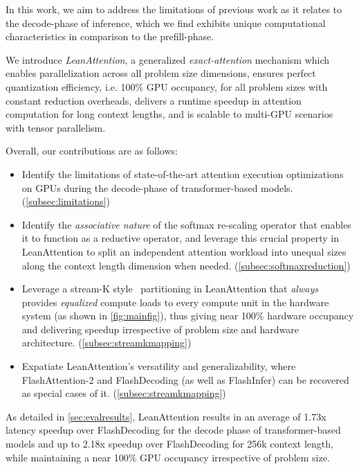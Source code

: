 In this work, we aim to address the limitations of previous work as it relates to the decode-phase of inference, which we find exhibits unique computational characteristics in comparison to the prefill-phase. 

We introduce \emph{LeanAttention}, a generalized \emph{exact-attention} mechanism which enables parallelization across all problem size dimensions, ensures perfect quantization efficiency, i.e. 100\% GPU occupancy, for all problem sizes with constant reduction overheads, delivers a runtime speedup in attention computation for long context lengths, and is scalable to multi-GPU scenarios with tensor parallelism. 

Overall, our contributions are as follows:

\begin{itemize}[noitemsep]

    \item Identify the limitations of state-of-the-art attention execution optimizations on GPUs during the decode-phase of transformer-based models. (\autoref{subsec:limitations})

    \item Identify the \textit{associative nature} of the softmax re-scaling operator that enables it to function as a reductive operator, and leverage this crucial property in LeanAttention to split an independent attention workload into unequal sizes along the context length dimension when needed. (\autoref{subsec:softmaxreduction})
    \item Leverage a stream-K style~\cite{streamk} partitioning in LeanAttention that \textit{always} provides \textit{equalized} compute loads to every compute unit in the hardware system (as shown in \autoref{fig:mainfig}), thus giving near 100\% hardware occupancy and delivering speedup irrespective of problem size and hardware architecture. (\autoref{subsec:streamkmapping})

    \item Expatiate LeanAttention's versatility and generalizability, where FlashAttention-2 and FlashDecoding (as well as FlashInfer) can be recovered as special cases of it. (\autoref{subsec:streamkmapping})

\end{itemize}

As detailed in \autoref{sec:evalresults}, LeanAttention results in an average of 1.73x latency speedup over FlashDecoding for the decode phase of transformer-based models and up to 2.18x speedup over FlashDecoding for 256k context length, while maintaining a near 100\% GPU occupancy irrespective of problem size. 

